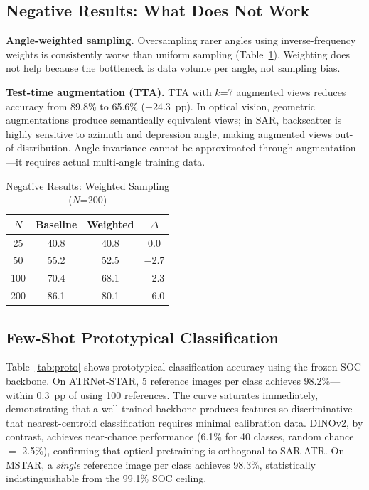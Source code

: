 \documentclass[journal]{IEEEtran}
\begin{document}
\subsection{Negative Results: What Does Not Work}

\textbf{Angle-weighted sampling.} Oversampling rarer angles using
inverse-frequency weights is consistently worse than uniform sampling
(Table~\ref{tab:negative}). Weighting does not help because the bottleneck is
data volume per angle, not sampling bias.

\textbf{Test-time augmentation (TTA).} TTA with $k$=7 augmented views reduces
accuracy from 89.8\% to 65.6\% ($-$24.3~pp). In optical vision, geometric
augmentations produce semantically equivalent views; in SAR, backscatter is
highly sensitive to azimuth and depression angle, making augmented views
out-of-distribution. Angle invariance cannot be approximated through
augmentation---it requires actual multi-angle training data.

\begin{table}[t]
  \caption{Negative Results: Weighted Sampling ($N$=200)}
  \label{tab:negative}
  \centering
  \begin{tabular}{cccc}
    \toprule
    $N$ & Baseline & Weighted & $\Delta$ \\
    \midrule
    25  & 40.8 & 40.8 & 0.0 \\
    50  & 55.2 & 52.5 & $-$2.7 \\
    100 & 70.4 & 68.1 & $-$2.3 \\
    200 & 86.1 & 80.1 & $-$6.0 \\
    \bottomrule
  \end{tabular}
\end{table}

\subsection{Few-Shot Prototypical Classification}

Table~\ref{tab:proto} shows prototypical classification accuracy using the
frozen SOC backbone. On ATRNet-STAR, 5 reference images per class achieves
98.2\%---within 0.3~pp of using 100 references. The curve saturates
immediately, demonstrating that a well-trained backbone produces features so
discriminative that nearest-centroid classification requires minimal
calibration data. DINOv2, by contrast, achieves near-chance performance
(6.1\% for 40 classes, random chance $=$ 2.5\%), confirming that optical
pretraining is orthogonal to SAR ATR. On MSTAR, a \textit{single} reference
image per class achieves 98.3\%, statistically indistinguishable from the
99.1\% SOC ceiling.
\end{document}
